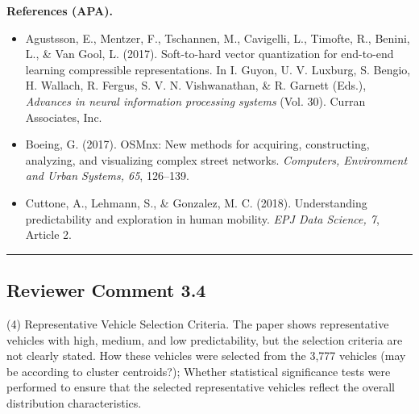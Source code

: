 \documentclass{NSF}
\begin{document}
\vskip 0.05in
\noindent\textbf{References (APA).}
\begin{itemize}
    \item Agustsson, E., Mentzer, F., Tschannen, M., Cavigelli, L., Timofte, R., Benini, L., \& Van Gool, L. (2017). Soft-to-hard vector quantization for end-to-end learning compressible representations. In I. Guyon, U. V. Luxburg, S. Bengio, H. Wallach, R. Fergus, S. V. N. Vishwanathan, \& R. Garnett (Eds.), \textit{Advances in neural information processing systems} (Vol. 30). Curran Associates, Inc.
    \item Boeing, G. (2017). OSMnx: New methods for acquiring, constructing, analyzing, and visualizing complex street networks. \textit{Computers, Environment and Urban Systems, 65}, 126--139.
    \item Cuttone, A., Lehmann, S., \& Gonzalez, M. C. (2018). Understanding predictability and exploration in human mobility. \textit{EPJ Data Science, 7}, Article 2.
\end{itemize}

\noindent\rule{16.5cm}{1.0pt}

\subsection{Reviewer Comment 3.4}
\begin{mdframed}
(4) Representative Vehicle Selection Criteria. The paper shows representative vehicles with high, medium, and low predictability, but the selection criteria are not clearly stated. How these vehicles were selected from the 3,777 vehicles (may be according to cluster centroids?); Whether statistical significance tests were performed to ensure that the selected representative vehicles reflect the overall distribution characteristics.
\end{mdframed}
\end{document}
